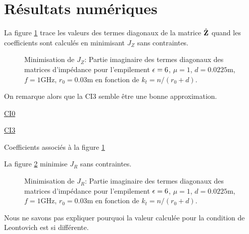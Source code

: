 \section{Résultats numériques}

  La figure \ref{fig:imp_fourier:sphere:hoppe:62:hoibc:mode_2} trace les valeurs des termes diagonaux de la matrice \(\hat{\mathbf{Z}}\) quand les coefficients sont calculés en minimisant \(J_Z\) sans contraintes.
  \begin{figure}[!hbt]
    \centering
    
    \caption[CIOE sur empilement de Hoppe & Rahmat-Samii p.~62]{Minimisation de \(J_Z\): Partie imaginaire des termes diagonaux des matrices d'impédance pour l'empilement \(\epsilon = 6\), \(\mu = 1\), \(d=0.0225\text{m}\), \(f=1\text{GHz}\), \(r_0=0.03\text{m}\) en fonction de \(k_t = n / (r_0+d)\).}
    \label{fig:imp_fourier:sphere:hoppe:62:hoibc:mode_2}
  \end{figure}
  On remarque alors que la CI3 semble être une bonne approximation. 

  \begin{table}[!hbt]
    \centering
    \begin{minipage}[t]{0.49\textwidth}
      \vspace{0pt}
      \centering
      \begin{coefftable}{\hyperlink{ci0}{CI0}}
        
      \end{coefftable}
    \end{minipage}
    \begin{minipage}[t]{0.49\textwidth}
      \vspace{0pt}
      \centering
      \begin{coefftable}{\hyperlink{ci3}{CI3}}
        
      \end{coefftable}
    \end{minipage}
    \caption{Coefficients associés à la figure \ref{fig:imp_fourier:sphere:hoppe:62:hoibc:mode_2}}
    \label{tab:imp_fourier:sphere:hoppe:62:hoibc:mode_2}
  \end{table}

  La figure \ref{fig:imp_fourier:sphere:hoppe:62:hoibc:mode_1} minimise \(J_R\) sans contraintes.
  \begin{figure}[!hbt]
    \centering
    
    \caption[CIOE sur empilement de Hoppe & Rahmat-Samii p.~62]{Minimisation de \(J_R\): Partie imaginaire des termes diagonaux des matrices d'impédance pour l'empilement \(\epsilon = 6\), \(\mu = 1\), \(d=0.0225\text{m}\), \(f=1\text{GHz}\), \(r_0=0.03\text{m}\) en fonction de \(k_t = n / (r_0+d)\).}
    \label{fig:imp_fourier:sphere:hoppe:62:hoibc:mode_1}
  \end{figure}
  Nous ne savons pas expliquer pourquoi la valeur calculée pour la condition de Leontovich est si différente.


